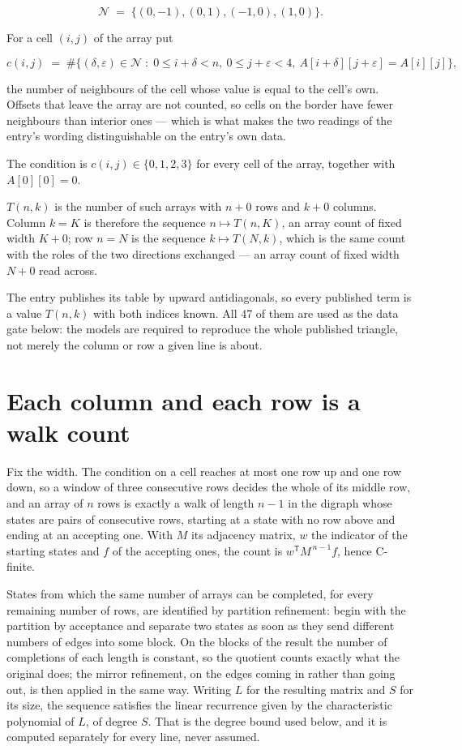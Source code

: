 \documentclass[11pt]{article}
\theoremstyle{definition}
\begin{document}
\[\mathcal{N} \;=\; \{(0,-1), (0,1), (-1,0), (1,0)\}.\]

For a cell $(i,j)$ of the array put

\[c(i,j) \;=\; \#\bigl\{(\delta,\varepsilon)\in\mathcal{N} \;:\; 0\le i+\delta<n,\ 0\le j+\varepsilon<4,\ A[i+\delta][j+\varepsilon] = A[i][j]\bigr\},\]

the number of neighbours of the cell whose value is equal to the cell's own. Offsets that leave the array are not counted, so cells on the border have fewer neighbours than interior ones --- which is what makes the two readings of the entry's wording distinguishable on the entry's own data.

The condition is $c(i,j) \in \{0, 1, 2, 3\}$ for every cell of the array, together with $A[0][0]=0$.

$T(n,k)$ is the number of such arrays with $n + 0$ rows and $k + 0$ columns. Column $k = K$ is therefore the sequence $n \mapsto T(n,K)$, an array count of fixed width $K + 0$; row $n = N$ is the sequence $k \mapsto T(N,k)$, which is the same count with the roles of the two directions exchanged --- an array count of fixed width $N + 0$ read across.

The entry publishes its table by upward antidiagonals, so every published term is a value $T(n,k)$ with both indices known. All 47 of them are used as the data gate below: the models are required to reproduce the whole published triangle, not merely the column or row a given line is about.

\section{Each column and each row is a walk count}

Fix the width. The condition on a cell reaches at most one row up and one row down, so a window of three consecutive rows decides the whole of its middle row, and an array of $n$ rows is exactly a walk of length $n-1$ in the digraph whose states are pairs of consecutive rows, starting at a state with no row above and ending at an accepting one. With $M$ its adjacency matrix, $w$ the indicator of the starting states and $f$ of the accepting ones, the count is $w^{\mathsf T}M^{\,n-1}f$, hence C-finite.

States from which the same number of arrays can be completed, for every remaining number of rows, are identified by partition refinement: begin with the partition by acceptance and separate two states as soon as they send different numbers of edges into some block. On the blocks of the result the number of completions of each length is constant, so the quotient counts exactly what the original does; the mirror refinement, on the edges coming in rather than going out, is then applied in the same way. Writing $L$ for the resulting matrix and $S$ for its size, the sequence satisfies the linear recurrence given by the characteristic polynomial of $L$, of degree $S$. That is the degree bound used below, and it is computed separately for every line, never assumed.
\end{document}

